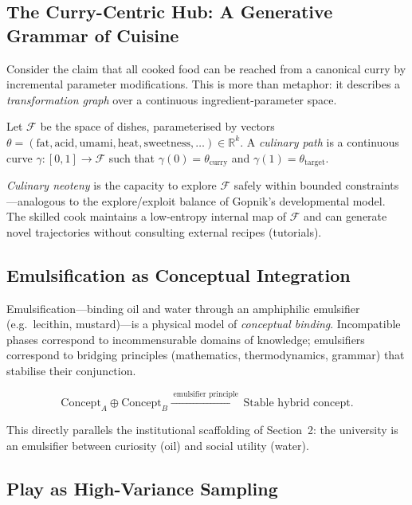 \documentclass[12pt,a4paper]{article}
\theoremstyle{definition}
\begin{document}
\subsection{The Curry-Centric Hub: A Generative Grammar of Cuisine}

Consider the claim that all cooked food can be reached from a canonical curry
by incremental parameter modifications.  This is more than metaphor: it
describes a \emph{transformation graph} over a continuous ingredient-parameter
space.

Let $\mathcal{F}$ be the space of dishes, parameterised by vectors
$\theta = (\text{fat}, \text{acid}, \text{umami}, \text{heat},
\text{sweetness}, \ldots) \in \mathbb{R}^k$.  A \emph{culinary path}
is a continuous curve $\gamma : [0,1] \to \mathcal{F}$ such that
$\gamma(0) = \theta_{\mathrm{curry}}$ and $\gamma(1) = \theta_{\mathrm{target}}$.

\emph{Culinary neoteny} is the capacity to explore $\mathcal{F}$ safely within
bounded constraints---analogous to the explore/exploit balance of Gopnik's
developmental model.  The skilled cook maintains a low-entropy internal map of
$\mathcal{F}$ and can generate novel trajectories without consulting external
recipes (tutorials).

\subsection{Emulsification as Conceptual Integration}

Emulsification---binding oil and water through an amphiphilic emulsifier
(e.g.\ lecithin, mustard)---is a physical model of \emph{conceptual binding}.
Incompatible phases correspond to incommensurable domains of knowledge;
emulsifiers correspond to bridging principles (mathematics, thermodynamics,
grammar) that stabilise their conjunction.

\begin{equation}
  \text{Concept}_A \oplus \text{Concept}_B
  \xrightarrow{\;\text{emulsifier principle}\;}
  \text{Stable hybrid concept.}
\end{equation}

This directly parallels the institutional scaffolding of Section~2: the
university is an emulsifier between curiosity (oil) and social utility (water).

\subsection{Play as High-Variance Sampling}
\end{document}
